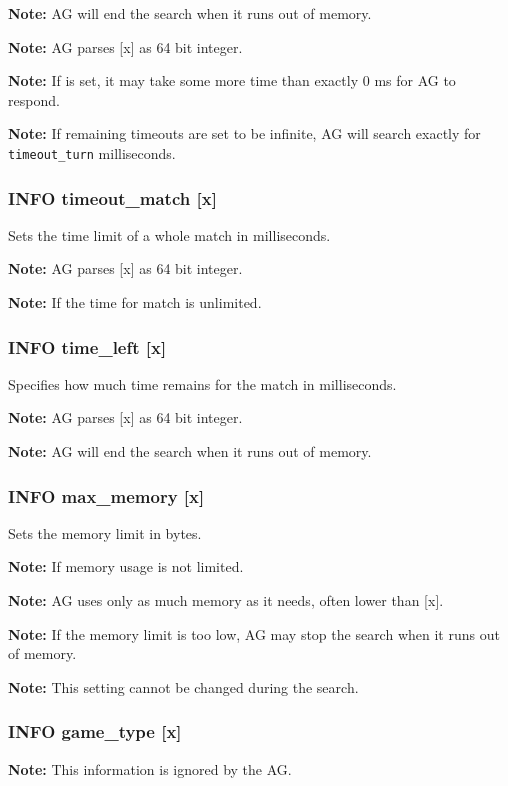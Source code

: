 \documentclass[12pt,a4paper]{article}
\begin{document}
\textbf{Note:} AG will end the search when it runs out of memory.

\textbf{Note:} AG parses [x] as 64 bit integer.

\textbf{Note:} If  is set, it may take some more time than exactly 0 ms for AG to respond.

\textbf{Note:} If remaining timeouts are set to be infinite, AG will search exactly for \texttt{timeout{\_}turn} milliseconds.

\subsubsection{INFO timeout{\_}match [x]}
\label{cmd_timeout_match}
Sets the time limit of a whole match in milliseconds.

\textbf{Note:} AG parses [x] as 64 bit integer.

\textbf{Note:} If  the time for match is unlimited.

\subsubsection{INFO time{\_}left [x]}
\label{cmd_info_time_left}
Specifies how much time remains for the match in milliseconds.

\textbf{Note:} AG parses [x] as 64 bit integer.

\textbf{Note:} AG will end the search when it runs out of memory.

\subsubsection{INFO max{\_}memory [x]}
\label{cmd_info_max_memory}
Sets the memory limit in bytes.

\textbf{Note:} If  memory usage is not limited.

\textbf{Note:} AG uses only as much memory as it needs, often lower than [x].

\textbf{Note:} If the memory limit is too low, AG may stop the search when it runs out of memory.

\textbf{Note:} This setting cannot be changed during the search.

\subsubsection{INFO game{\_}type [x]}
\label{cmd_info_game_type}
\textbf{Note:} This information is ignored by the AG.
\end{document}
